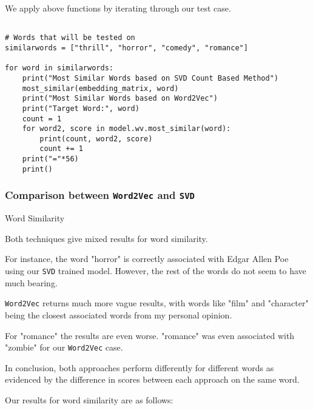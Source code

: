 \documentclass[12pt, letterpaper]{article}
\begin{document}
We apply above functions by iterating through our test case.

\begin{mdframed}[backgroundcolor=shadecolor]
\begin{verbatim}

# Words that will be tested on
similarwords = ["thrill", "horror", "comedy", "romance"]

for word in similarwords:
    print("Most Similar Words based on SVD Count Based Method")
    most_similar(embedding_matrix, word)
    print("Most Similar Words based on Word2Vec")
    print("Target Word:", word)
    count = 1
    for word2, score in model.wv.most_similar(word):
        print(count, word2, score)
        count += 1
    print("="*56)
    print()
\end{verbatim}
\end{mdframed}

\subsubsection{Comparison between \texttt{Word2Vec} and \texttt{SVD}}

{\large Word Similarity}

Both techniques give mixed results for word similarity. 

For instance, the word "horror" is correctly associated with Edgar Allen Poe using our \texttt{SVD} trained model. However, the rest of the words do not seem to have much bearing. 

\texttt{Word2Vec} returns much more vague results, with words like "film" and "character" being the closest associated words from my personal opinion.

For "romance" the results are even worse. "romance" was even associated with "zombie" for our \texttt{Word2Vec} case.

In conclusion, both approaches perform differently for different words as evidenced by the difference in scores between each approach on the same word.

Our results for word similarity are as follows:
\end{document}
